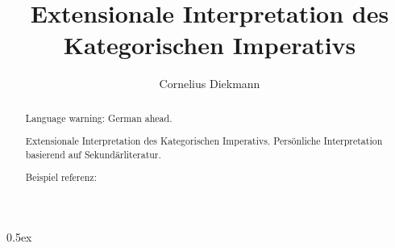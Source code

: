 \documentclass[11pt,a4paper]{article}
\begin{document}
\title{Extensionale Interpretation des Kategorischen Imperativs}
\author{Cornelius Diekmann}
\maketitle

\begin{abstract}
Language warning: German ahead.

Extensionale Interpretation des Kategorischen Imperativs.
Persönliche Interpretation basierend auf Sekundärliteratur.

Beispiel referenz: \cite{russellphi}
\end{abstract}

\tableofcontents

\parindent 0pt\parskip 0.5ex





\end{document}
